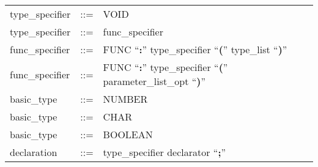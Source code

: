 \documentclass[11pt]{article}
\begin{document}
\begin{longtable}{lrl}
type\_specifier                            & ::= &
  \begin{minipage}[t]{\rulerhs}
    \raggedright
    VOID
  \end{minipage}                                                             \\
type\_specifier                            & ::= &
  \begin{minipage}[t]{\rulerhs}
    \raggedright
    func\_specifier
  \end{minipage}                                                             \\
func\_specifier                            & ::= &
  \begin{minipage}[t]{\rulerhs}
    \raggedright
    FUNC ``{\bf :}'' type\_specifier ``{\bf (}'' type\_list ``{\bf )}''
  \end{minipage}                                                             \\
func\_specifier                            & ::= &
  \begin{minipage}[t]{\rulerhs}
    \raggedright
    FUNC ``{\bf :}'' type\_specifier ``{\bf (}'' parameter\_list\_opt ``{\bf )}''
  \end{minipage}                                                             \\
basic\_type                                & ::= &
  \begin{minipage}[t]{\rulerhs}
    \raggedright
    NUMBER
  \end{minipage}                                                             \\
basic\_type                                & ::= &
  \begin{minipage}[t]{\rulerhs}
    \raggedright
    CHAR
  \end{minipage}                                                             \\
basic\_type                                & ::= &
  \begin{minipage}[t]{\rulerhs}
    \raggedright
    BOOLEAN
  \end{minipage}                                                             \\
declaration                                & ::= &
  \begin{minipage}[t]{\rulerhs}
    \raggedright
    type\_specifier declarator ``{\bf ;}''
  \end{minipage}                                                             \\

\end{longtable}
\end{document}
